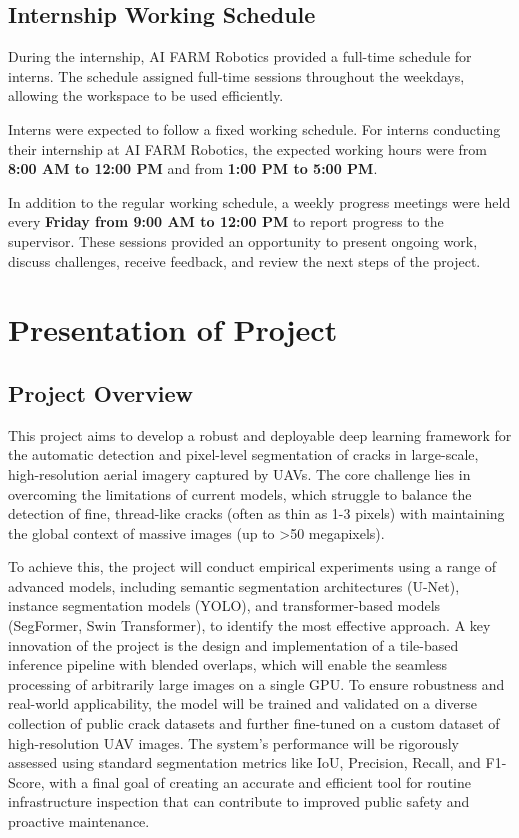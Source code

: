 \subsection{Internship Working Schedule}

\hs During the internship, AI FARM Robotics provided a full-time schedule for interns. The schedule assigned full-time sessions throughout the weekdays, allowing the workspace to be used efficiently.

\hs Interns were expected to follow a fixed working schedule. For interns conducting their internship at AI FARM Robotics, the expected working hours were from \textbf{8:00 AM to 12:00 PM} and from \textbf{1:00 PM to 5:00 PM}.

\hs In addition to the regular working schedule, a weekly progress meetings were held every \textbf{Friday from 9:00 AM to 12:00 PM} to report progress to the supervisor. These sessions provided an opportunity to present ongoing work, discuss challenges, receive feedback, and review the next steps of the project.

\section{Presentation of Project}

\subsection{Project Overview}

\hs This project aims to develop a robust and deployable deep learning framework for the automatic detection and pixel-level segmentation of cracks in large-scale, high-resolution aerial imagery captured by UAVs. The core challenge lies in overcoming the limitations of current models, which struggle to balance the detection of fine, thread-like cracks (often as thin as 1-3 pixels) with maintaining the global context of massive images (up to >50 megapixels).

\hs To achieve this, the project will conduct empirical experiments using a range of advanced models, including semantic segmentation architectures (U-Net), instance segmentation models (YOLO), and transformer-based models (SegFormer, Swin Transformer), to identify the most effective approach. A key innovation of the project is the design and implementation of a tile-based inference pipeline with blended overlaps, which will enable the seamless processing of arbitrarily large images on a single GPU. To ensure robustness and real-world applicability, the model will be trained and validated on a diverse collection of public crack datasets and further fine-tuned on a custom dataset of high-resolution UAV images. The system's performance will be rigorously assessed using standard segmentation metrics like IoU, Precision, Recall, and F1-Score, with a final goal of creating an accurate and efficient tool for routine infrastructure inspection that can contribute to improved public safety and proactive maintenance.

